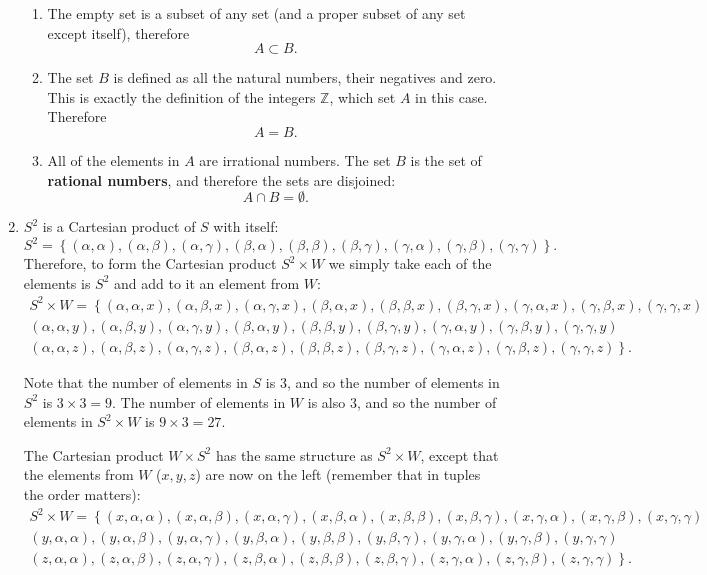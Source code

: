 \begin{enumerate}
\begin{enumerate}[label={(\roman*)}]
			\item The empty set is a subset of any set (and a proper subset of any set except itself), therefore
				\[
					A\subset B.
				\]

			\item The set $B$ is defined as all the natural numbers, their negatives and zero. This is exactly the definition of the integers $\mathbb{Z}$, which set $A$ in this case. Therefore
				\[
					A=B.
				\]

			\item All of the elements in $A$ are irrational numbers. The set $B$ is the set of \textbf{rational numbers}, and therefore the sets are disjoined:
				\[
					A\cap B = \emptyset.
				\]
		\end{enumerate}

	\item $S^{2}$ is a Cartesian product of $S$ with itself:
		\[
			S^{2} = \left\{ (\alpha,\alpha), (\alpha,\beta), (\alpha,\gamma), (\beta,\alpha), (\beta,\beta), (\beta,\gamma), (\gamma,\alpha), (\gamma,\beta), (\gamma,\gamma) \right\}.
		\]
		Therefore, to form the Cartesian product $S^{2}\times W$ we simply take each of the elements is $S^{2}$ and add to it an element from $W$:
		\begin{align*}
			S^{2}\times W =
			\left\{(\alpha,\alpha,x), (\alpha,\beta,x), (\alpha,\gamma,x), (\beta,\alpha,x), (\beta,\beta,x), (\beta,\gamma,x), (\gamma,\alpha,x), (\gamma,\beta,x), (\gamma,\gamma,x)\right.\\
			\left.(\alpha,\alpha,y), (\alpha,\beta,y), (\alpha,\gamma,y), (\beta,\alpha,y), (\beta,\beta,y), (\beta,\gamma,y), (\gamma,\alpha,y), (\gamma,\beta,y), (\gamma,\gamma,y)\right.\\
			\left.(\alpha,\alpha,z), (\alpha,\beta,z), (\alpha,\gamma,z), (\beta,\alpha,z), (\beta,\beta,z), (\beta,\gamma,z), (\gamma,\alpha,z), (\gamma,\beta,z), (\gamma,\gamma,z)\right\}.
		\end{align*}

		Note that the number of elements in $S$ is $3$, and so the number of elements in $S^{2}$ is $3\times3=9$. The number of elements in $W$ is also $3$, and so the number of elements in $S^{2}\times W$ is $9\times3=27$.

		The Cartesian product $W\times S^{2}$ has the same structure as $S^{2}\times W$, except that the elements from $W$ ($x,y,z$) are now on the left (remember that in tuples the order matters):
		\begin{align*}
			S^{2}\times W =
			\left\{(x,\alpha,\alpha), (x,\alpha,\beta), (x,\alpha,\gamma), (x,\beta,\alpha), (x,\beta,\beta), (x,\beta,\gamma), (x,\gamma,\alpha), (x,\gamma,\beta), (x,\gamma,\gamma)\right.\\
			\left.(y,\alpha,\alpha), (y,\alpha,\beta), (y,\alpha,\gamma), (y,\beta,\alpha), (y,\beta,\beta), (y,\beta,\gamma), (y,\gamma,\alpha), (y,\gamma,\beta), (y,\gamma,\gamma)\right.\\
			\left.(z,\alpha,\alpha), (z,\alpha,\beta), (z,\alpha,\gamma), (z,\beta,\alpha), (z,\beta,\beta), (z,\beta,\gamma), (z,\gamma,\alpha), (z,\gamma,\beta), (z,\gamma,\gamma)\right\}.
		\end{align*}

\end{enumerate}
